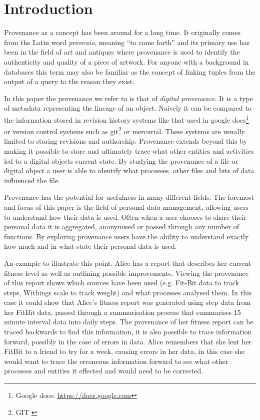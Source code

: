\chapter{Introduction}

Provenance as a concept has been around for a long time. It originally comes from the Latin word \textit{provenio}, meaning ``to come forth'' and its primary use has been in the field of art and antiques where provenance is used to identify the authenticity and quality of a piece of artwork. For anyone with a background in databases this term may also be familiar as the concept of linking tuples from the output of a query to the reason they exist.

In this paper the provenance we refer to is that of \textit{digital provenance}. It is a type of metadata representing the lineage of an object. Naively it can be compared to the information stored in revision history systems like that used in google docs\footnote{Google docs: \url{https://docs.google.com}} or version control
systems such as git\footnote{GIT\: \url{}} or mercurial. These systems are usually limited to storing revisions and authorship. Provenance extends beyond this by making it possible to store and ultimately trace what other entities and activities led to a digital objects current state. By studying the provenance of a file or digital object a user is able to identify what processes, other files and bits of data influenced the file.

Provenance has the potential for usefulness in many different fields. The foremost and focus of this paper is the field of personal data management, allowing users to understand how their data is used. Often when a user chooses to share their personal data it is aggregated, anonymised or passed through any number of functions. By exploring provenance users have the ability to understand exactly how much and in what state their personal data is used.

An example to illustrate this point. Alice has a report that describes her current fitness level as well as outlining possible improvements. Viewing the provenance of
this report shows which sources have been used (e.g. Fit-Bit data to track steps, Withings scale to track weight) and what processes analysed them. In this case it could show that Alice's fitness report was generated using step data from her FitBit data, passed through a summarisation process that summarises 15 minute interval data into daily steps. The provenance of her fitness report can be traced backwards to find this information, it is also possible to trace information forward, possibly in the case of errors in data. Alice remembers that she lent her FitBit to a friend to try for a week, causing errors in her data, in this case she would want to trace the erroneous information forward to see what other processes and entities it effected and would need to be corrected.


